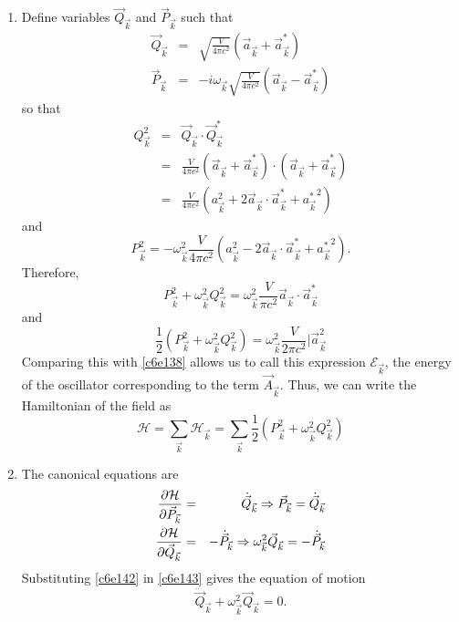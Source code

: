 \begin{enumerate}
\item Define variables $\vec{Q}_{\vec{k}}$ and $\vec{P}_{\vec{k}}$ such that
\begin{eqnarray}
\vec{Q}_{\vec{k}} &=& \sqrt{\frac{V}{4\pi c^2}}(\vec{a}_{\vec{k}} + \vec{a}_{\vec{k}}^\ast) \label{c6e139} \\
\vec{P}_{\vec{k}} &=& -i\omega_{\vec{k}}\sqrt{\frac{V}{4\pi c^2}}(\vec{a}_{\vec{k}} - \vec{a}_{\vec{k}}^\ast) \label{c6e140}
\end{eqnarray}
so that
\begin{eqnarray*}
Q_{\vec{k}}^2 &=& \vec{Q}_{\vec{k}} \cdot \vec{Q}_{\vec{k}}^\ast \\
 &=& \frac{V}{4\pi c^2}(\vec{a}_{\vec{k}} + \vec{a}_{\vec{k}}^\ast)\cdot(\vec{a}_{\vec{k}} + \vec{a}_{\vec{k}}^\ast) \\
 &=& \frac{V}{4\pi c^2}(a_{\vec{k}}^2 + 2\vec{a}_{\vec{k}}\cdot\vec{a}_{\vec{k}}^\ast + {a_{\vec{k}}^\ast}^2)
\end{eqnarray*}
and
\[
P_{\vec{k}}^2 = -\omega_{\vec{k}}^2\frac{V}{4\pi c^2}(a_{\vec{k}}^2 - 2\vec{a}_{\vec{k}}\cdot\vec{a}_{\vec{k}}^\ast + {a_{\vec{k}}^\ast}^2).
\]
Therefore,
\[
P_{\vec{k}}^2 + \omega_{\vec{k}}^2Q_{\vec{k}}^2 = \omega_{\vec{k}}^2\frac{V}{\pi c^2}\vec{a}_{\vec{k}}\cdot\vec{a}_{\vec{k}}^\ast
\]
and
\[
\frac{1}{2}(P_{\vec{k}}^2 + \omega_{\vec{k}}^2Q_{\vec{k}}^2) = \omega_{\vec{k}}^2\frac{V}{2\pi c^2}|\vec{a}_{\vec{k}}^2
\]
Comparing this with \eqref{c6e138} allows us to call this expression $\mathcal{E}_{\vec{k}}$,
the energy of the oscillator corresponding to the term $\vec{A}_{\vec{k}}$. Thus,
we can write the Hamiltonian of the field as
\begin{equation}\label{c6e141}
\mathcal{H} = \sum_{\vec{k}}\mathcal{H}_{\vec{k}} = 
\sum_{\vec{k}}\frac{1}{2}(P_{\vec{k}}^2 + \omega_{\vec{k}}^2Q_{\vec{k}}^2)
\end{equation}

\item The canonical equations are
\begin{eqnarray}
\frac{\partial{\mathcal{H}}}{\partial{\vec{P}_{\vec{k}}}} &=& \dot{\vec{Q}}_{\vec{k}} \Rightarrow 
 \vec{P}_{\vec{k}} = \dot{\vec{Q}}_{\vec{k}} \label{c6e142} \\
\frac{\partial{\mathcal{H}}}{\partial{\vec{Q}_{\vec{k}}}} &=& -\dot{\vec{P}}_{\vec{k}} \Rightarrow
 \omega_{\vec{k}}^2\vec{Q}_{\vec{k}} = -\dot{\vec{P}}_{\vec{k}} \label{c6e143}
\end{eqnarray}
Substituting \eqref{c6e142} in \eqref{c6e143} gives the equation of motion
\begin{equation}\label{c6e144}
\ddot{\vec{Q}}_{\vec{k}} + \omega_{\vec{k}}^2\vec{Q}_{\vec{k}} = 0.
\end{equation}


\end{enumerate}
